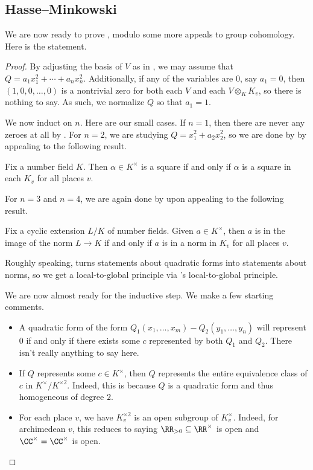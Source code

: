 \documentclass[../notes.tex]{subfiles}
\begin{document}
\subsection{Hasse--Minkowski}
We are now ready to prove , modulo some more appeals to group cohomology. Here is the statement.
\hmthm*
\begin{proof}
	By adjusting the basis of $V$ as in , we may assume that $Q=a_1x_1^2+\cdots+a_nx_n^2$. Additionally, if any of the variables are $0$, say $a_1=0$, then $(1,0,0,\ldots,0)$ is a nontrivial zero for both each $V$ and each $V\otimes_KK_v$, so there is nothing to say. As such, we normalize $Q$ so that $a_1=1$.

	We now induct on $n$. Here are our small cases. If $n=1$, then there are never any zeroes at all by . For $n=2$, we are studying $Q=x_1^2+a_2x_2^2$, so we are done by  by appealing to the following result.
	\begin{theorem}
		Fix a number field $K$. Then $\alpha\in K^\times$ is a square if and only if $\alpha$ is a square in each $K_v$ for all places $v$.
	\end{theorem}
	For $n=3$ and $n=4$, we are again done by  upon appealing to the following result.
	\begin{theorem} \label{thm:hasse-norm}
		Fix a cyclic extension $L/K$ of number fields. Given $a\in K^\times$, then $a$ is in the image of the norm $L\to K$ if and only if $a$ is in a norm in $K_v$ for all places $v$.
	\end{theorem}
	Roughly speaking,  turns statements about quadratic forms into statements about norms, so we get a local-to-global principle via 's local-to-global principle.

	We are now almost ready for the inductive step. We make a few starting comments.
	\begin{itemize}
		\item A quadratic form of the form $Q_1(x_1,\ldots,x_m)-Q_2(y_1,\ldots,y_n)$ will represent $0$ if and only if there exists some $c$ represented by both $Q_1$ and $Q_2$. There isn't really anything to say here.
		\item If $Q$ represents some $c\in K^\times$, then $Q$ represents the entire equivalence class of $c$ in $K^\times/K^{\times2}$. Indeed, this is because $Q$ is a quadratic form and thus homogeneous of degree $2$.
		\item For each place $v$, we have $K_v^{\times2}$ is an open subgroup of $K_v^\times$. Indeed, for archimedean $v$, this reduces to saying $\RR_{>0}\subseteq\RR^\times$ is open and $\CC^\times=\CC^\times$ is open.


\end{itemize}
\end{proof}
\end{document}
